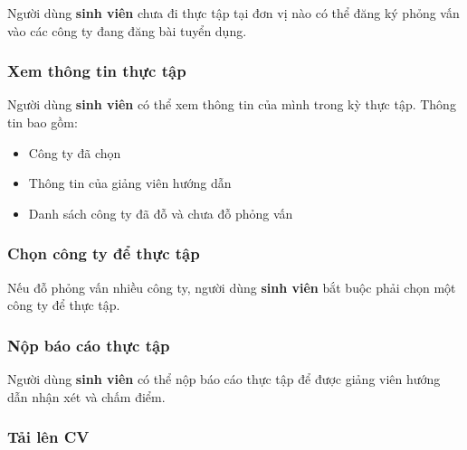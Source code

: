 \documentclass[./../main.tex]{subfiles}
\begin{document}
Người dùng \textbf{sinh viên} chưa đi thực tập tại đơn vị nào có thể
đăng ký phỏng vấn vào các công ty đang đăng bài tuyển dụng.

\hypertarget{xem-thuxf4ng-tin-thux1ef1c-tux1eadp}{%
	\subsubsection{Xem thông tin thực
		tập}\label{xem-thuxf4ng-tin-thux1ef1c-tux1eadp}}

Người dùng \textbf{sinh viên} có thể xem thông tin của mình trong kỳ
thực tập. Thông tin bao gồm:

\begin{itemize}
	\item

	      Công ty đã chọn

	\item

	      Thông tin của giảng viên hướng dẫn

	\item

	      Danh sách công ty đã đỗ và chưa đỗ phỏng vấn

\end{itemize}

\hypertarget{chux1ecdn-cuxf4ng-ty-ux111ux1ec3-thux1ef1c-tux1eadp}{%
	\subsubsection{Chọn công ty để thực
		tập}\label{chux1ecdn-cuxf4ng-ty-ux111ux1ec3-thux1ef1c-tux1eadp}}

Nếu đỗ phỏng vấn nhiều công ty, người dùng \textbf{sinh viên} bắt buộc
phải chọn một công ty để thực tập.

\hypertarget{nux1ed9p-buxe1o-cuxe1o-thux1ef1c-tux1eadp}{%
	\subsubsection{Nộp báo cáo thực
		tập}\label{nux1ed9p-buxe1o-cuxe1o-thux1ef1c-tux1eadp}}

Người dùng \textbf{sinh viên} có thể nộp báo cáo thực tập để được giảng
viên hướng dẫn nhận xét và chấm điểm.

\hypertarget{tux1ea3i-luxean-cv}{%
	\subsubsection{Tải lên CV}\label{tux1ea3i-luxean-cv}}
\end{document}
